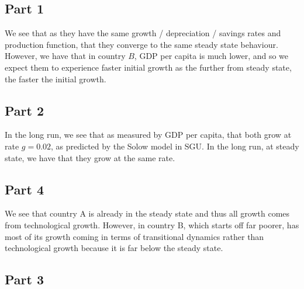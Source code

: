 \documentclass[12pt,letterpaper]{article}
\theoremstyle{definition}
\begin{document}
\subsection*{Part 1}

We see that as they have the same growth / depreciation / savings rates and production
function, that they converge to the same steady state behaviour. However, we
have that in country $B$, GDP per capita is much lower, and so we expect them to
experience faster initial growth as the further from steady state, the faster
the initial growth.

\subsection*{Part 2}

In the long run, we see that as measured by GDP per capita, that both grow at
rate $g = 0.02$, as predicted by the Solow model in SGU. In the long run, at
steady state, we have that they grow at the same rate.

\subsection*{Part 4}

We see that country A is already in the steady state and thus all growth comes
from technological growth. However, in country B, which starts off far poorer,
has most of its growth coming in terms of transitional dynamics rather than
technological growth because it is far below the steady state.

\break

\subsection*{Part 3}
\end{document}
